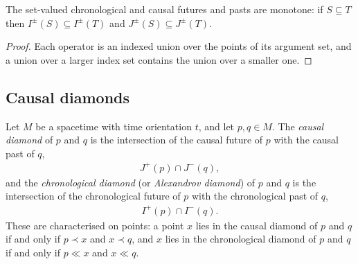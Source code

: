 \begin{lemma}
    \label{lmm:future-past-monotone}
    \leanok
    The set-valued chronological and causal futures and pasts are monotone: if $S \subseteq T$ then $I^\pm(S) \subseteq I^\pm(T)$ and $J^\pm(S) \subseteq J^\pm(T)$.
\end{lemma}
\begin{proof}
    \leanok
    Each operator is an indexed union over the points of its argument set, and a union over a larger index set contains the union over a smaller one.
\end{proof}

\subsection{Causal diamonds}

\begin{definition}
    \label{def:causal-diamond}
    \leanok
    Let $M$ be a spacetime with time orientation $t$, and let $p, q \in M$. The \textit{causal diamond} of $p$ and $q$ is the intersection of the causal future of $p$ with the causal past of $q$,
    \begin{align}
        J^+(p) \cap J^-(q),
    \end{align}
    and the \textit{chronological diamond} (or \textit{Alexandrov diamond}) of $p$ and $q$ is the intersection of the chronological future of $p$ with the chronological past of $q$,
    \begin{align}
        I^+(p) \cap I^-(q).
    \end{align}
    These are characterised on points: a point $x$ lies in the causal diamond of $p$ and $q$ if and only if $p \prec x$ and $x \prec q$, and $x$ lies in the chronological diamond of $p$ and $q$ if and only if $p \ll x$ and $x \ll q$.
\end{definition}

